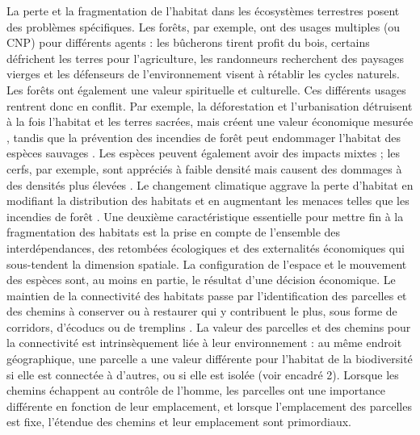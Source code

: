 La perte et la fragmentation de l'habitat dans les écosystèmes terrestres posent des problèmes spécifiques. Les forêts, par exemple, ont des usages multiples (ou CNP) pour différents agents : les bûcherons tirent profit du bois, certains défrichent les terres pour l'agriculture, les randonneurs recherchent des paysages vierges et les défenseurs de l'environnement visent à rétablir les cycles naturels. Les forêts ont également une valeur spirituelle et culturelle. Ces différents usages rentrent donc en conflit. Par exemple, la déforestation et l'urbanisation détruisent à la fois l'habitat et les terres sacrées, mais créent une valeur économique mesurée \citep{giglio_economics_2024}, tandis que la prévention des incendies de forêt peut endommager l'habitat des espèces sauvages \citep{bradshaw2018}. Les espèces peuvent également avoir des impacts mixtes ; les cerfs, par exemple, sont appréciés à faible densité mais causent des dommages à des densités plus élevées \citep{putman_identifying_2011}. Le changement climatique aggrave la perte d'habitat en modifiant la distribution des habitats et en augmentant les menaces telles que les incendies de forêt \citep{Dupuy2019ClimateCI,wasserman_climate_2023}.
    Une deuxième caractéristique essentielle pour mettre fin à la fragmentation des habitats est la prise en compte de l'ensemble des interdépendances, des retombées écologiques et des externalités économiques qui sous-tendent la dimension spatiale. La configuration de l'espace et le mouvement des espèces sont, au moins en partie, le résultat d'une décision économique. Le maintien de la connectivité des habitats passe par l'identification des parcelles et des chemins à conserver ou à restaurer qui y contribuent le plus, sous forme de corridors, d'écoducs ou de tremplins \citep{Turner2005, Turner2011}. La valeur des parcelles et des chemins pour la connectivité est intrinsèquement liée à leur environnement : au même endroit géographique, une parcelle a une valeur différente pour l'habitat de la biodiversité si elle est connectée à d'autres, ou si elle est isolée (voir encadré 2). Lorsque les chemins échappent au contrôle de l'homme, les parcelles ont une importance différente en fonction de leur emplacement, et lorsque l'emplacement des parcelles est fixe, l'étendue des chemins et leur emplacement sont primordiaux.
\\
